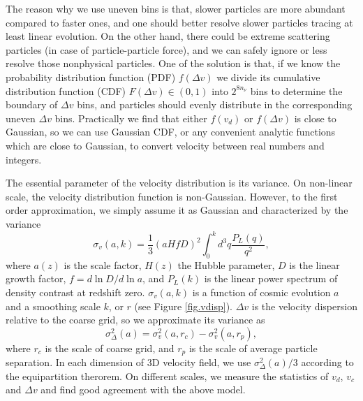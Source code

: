 \documentclass[10pt,twocolumn,preprint]{emulateapj}
\begin{document}
The reason why we use uneven bins is that, slower particles are more 
abundant compared to faster ones, and one should better resolve slower 
particles tracing at least linear evolution. On the other hand, there could 
be extreme scattering particles (in case of particle-particle force), and we 
can safely ignore or less resolve those nonphysical particles. One of the 
solution is that, if we know the probability distribution function (PDF) 
$f(\Delta v)$ we divide its cumulative distribution function (CDF) $F(\Delta 
v)\in(0,1)$ into $2^{8n_\nu}$ bins to determine the boundary of $\Delta v$ 
bins, and particles should evenly distribute in the corresponding uneven $
\Delta v$ bins. Practically we find that either $f(v_d)$ or $f(\Delta v)$ is 
close to Gaussian, so we can use Gaussian CDF, or any convenient analytic 
functions which are close to Gaussian, to convert velocity between real 
numbers and integers.

The essential parameter of the velocity distribution is its variance. On 
non-linear scale, the velocity distribution function is non-Gaussian. 
However, to the first order approximation, we simply assume it as Gaussian 
and characterized by the variance
\begin{equation}\label{eq.vdisp}
	\sigma_v(a,k) = \frac{1}{3}  (a H f D)^2 \int_0^kd^3q\frac{P_{L}(q)}{q^2},
\end{equation}
where $a(z)$ is the scale factor, $H(z)$ the Hubble parameter, $D$ is the 
linear growth factor, $f=d \ln D/d\ln a$, and $P_L(k)$ is the linear power 
spectrum of density contrast at redshift zero.
$\sigma_v(a,k)$ is a function of cosmic evolution $a$ and a smoothing scale 
$k$, or $r$ (see Figure \ref{fig.vdisp}). $\Delta v$
is the velocity dispersion relative to the coarse grid, so we approximate 
its variance as
\begin{equation}\label{eq.vdelta}
	\sigma^2_{\Delta}(a)=\sigma^2_v(a,r_c)-\sigma^2_v(a,r_p), 
\end{equation}
where $r_c$ is the scale of
coarse grid, and $r_p$ is the scale of average particle separation. In each
dimension of 3D velocity field, we use $\sigma^2_{\Delta}(a)/3$ according 
to the equipartition therorem. On different scales, we measure the 
statistics of $v_d$, $v_c$ and $\Delta v$ and find good agreement with the 
above model.
\end{document}
